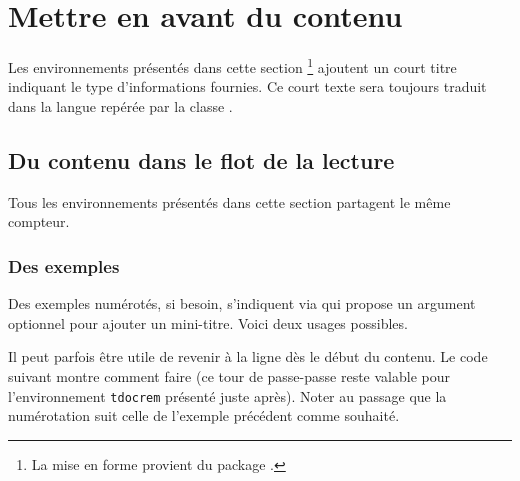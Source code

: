 \documentclass[10pt, a4paper]{../main/main}
\begin{document}
\section{Mettre en avant du contenu}

\begin{tdocnote}
    Les environnements présentés dans cette section
    \footnote{
        La mise en forme provient du package .
    }
    ajoutent un court titre indiquant le type d'informations fournies.
    Ce court texte sera toujours traduit dans la langue repérée par la classe \thisproj.
\end{tdocnote}



\subsection{Du contenu dans le flot de la lecture}

\begin{tdocimp}
    Tous les environnements présentés dans cette section partagent le même compteur.
\end{tdocimp}



\subsubsection{Des exemples}

Des exemples numérotés, si besoin, s'indiquent via  qui propose un argument optionnel pour ajouter un mini-titre.
Voici deux usages possibles.





\begin{tdoctip}
    Il peut parfois être utile de revenir à la ligne dès le début du contenu. Le code suivant montre comment faire (ce tour de passe-passe reste valable pour l'environnement \verb#tdocrem# présenté juste après). Noter au passage que la numérotation suit celle de l'exemple précédent comme souhaité.
\end{tdoctip}

\end{document}
